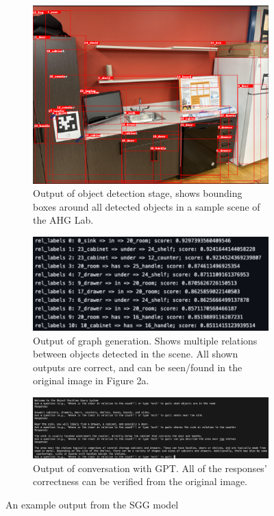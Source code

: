 \documentclass[letterpaper, 10 pt, conference]{ieeeconf}  %
\begin{document}
    \begin{figure}
        \centering
        \begin{subfigure}{0.48\textwidth}
            \centering
            \includegraphics[width=1\textwidth]{images/scene.png}
            \caption{Output of object detection stage, shows bounding boxes around all detected objects in a sample scene of the AHG Lab.}
            \label{fig:outputs}
        \end{subfigure}
        \begin{subfigure}{0.48\textwidth}
            \centering
            \includegraphics[width=1\textwidth]{images/graph.png}
            \caption{Output of graph generation. Shows multiple relations between objects detected in the scene. All shown outputs are correct, and can be seen/found in the original image in Figure 2a.}
            \label{fig:graph}
        \end{subfigure}
        \begin{subfigure}{0.48\textwidth}
            \centering
            \includegraphics[width=1\textwidth]{images/output.png}
            \caption{Output of conversation with GPT. All of the responses' correctness can be verified from the original image.}
            \label{fig:output}
        \end{subfigure}
        \caption{An example output from the SGG model}
        \label{fig:example}
        

\end{figure}
\end{document}
